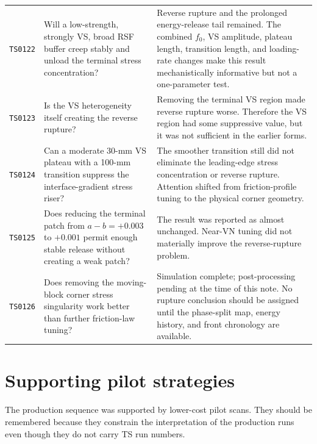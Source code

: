 \documentclass[11pt]{article}
\newcommand{\run}[1]{\texttt{TS#1}}
\begin{document}
\begin{longtable}{@{}C{1.25cm}L{5.3cm}L{8.2cm}@{}}
  \run{0122} & Will a low-strength, strongly VS, broad RSF buffer creep stably and unload the terminal stress concentration? & Reverse rupture and the prolonged energy-release tail remained.  The combined $f_0$, VS amplitude, plateau length, transition length, and loading-rate changes make this result mechanistically informative but not a one-parameter test. \\
  \run{0123} & Is the VS heterogeneity itself creating the reverse rupture? & Removing the terminal VS region made reverse rupture worse.  Therefore the VS region had some suppressive value, but it was not sufficient in the earlier forms. \\
  \run{0124} & Can a moderate 30-mm VS plateau with a 100-mm transition suppress the interface-gradient stress riser? & The smoother transition still did not eliminate the leading-edge stress concentration or reverse rupture.  Attention shifted from friction-profile tuning to the physical corner geometry. \\
  \run{0125} & Does reducing the terminal patch from $a-b=+0.003$ to $+0.001$ permit enough stable release without creating a weak patch? & The result was reported as almost unchanged.  Near-VN tuning did not materially improve the reverse-rupture problem. \\
  \run{0126} & Does removing the moving-block corner stress singularity work better than further friction-law tuning? & Simulation complete; post-processing pending at the time of this note.  No rupture conclusion should be assigned until the phase-split map, energy history, and front chronology are available. \\
\end{longtable}

\section{Supporting pilot strategies}

The production sequence was supported by lower-cost pilot scans.  They should
be remembered because they constrain the interpretation of the production
runs even though they do not carry TS run numbers.
\end{document}
